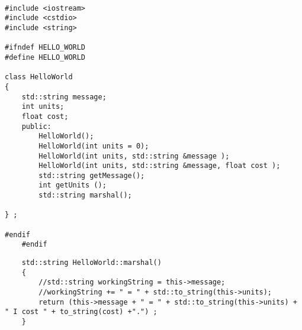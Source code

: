 \documentclass{article}
\begin{document}
\begin{lstlisting}
	
#include <iostream>
#include <cstdio>
#include <string>

#ifndef HELLO_WORLD
#define HELLO_WORLD

class HelloWorld
{
    std::string message;
    int units;
	float cost;
    public:
        HelloWorld();
        HelloWorld(int units = 0);
        HelloWorld(int units, std::string &message );
        HelloWorld(int units, std::string &message, float cost );
        std::string getMessage();
        int getUnits ();
		std::string marshal();

} ;

#endif 
	#endif
\end{lstlisting}


 

\begin{lstlisting}
	std::string HelloWorld::marshal()
	{
		//std::string workingString = this->message;
		//workingString += " = " + std::to_string(this->units);
	    return (this->message + " = " + std::to_string(this->units) + " I cost " + to_string(cost) +".") ;
	}
\end{lstlisting}
\end{document}
